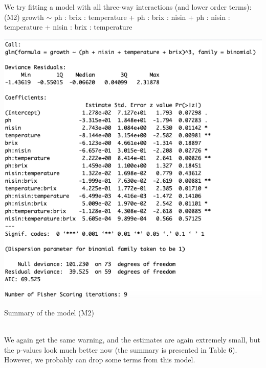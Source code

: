 \documentclass{article}
\begin{document}
We try fitting a model with all three-way interactions (and lower order terms): 
\\(M2)   growth $\sim$ ph : brix : temperature + ph : brix : nisin + ph : nisin : temperature + nisin : brix : temperature
\begin{table}[h!]
\includegraphics[scale = 0.5]{table6.png}
\caption{Summary of the model (M2) }
\end{table}
\\We again get the same warning, and the estimates are again extremely small, but the p-values look much better now (the summary is presented in Table 6). However, we probably can drop some terms from this model. \\
\end{document}
